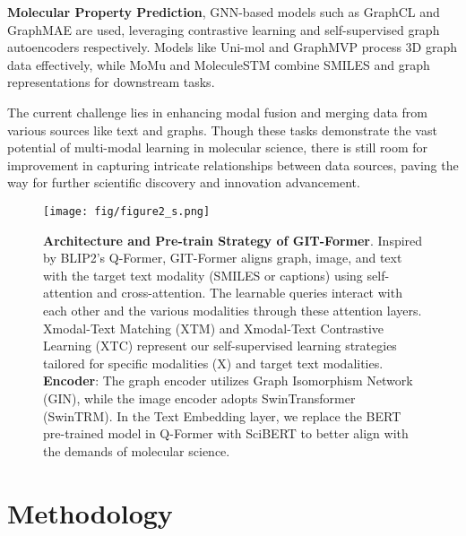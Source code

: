 \documentclass{article}
\begin{document}
\textbf{Molecular Property Prediction}, GNN-based models such as GraphCL\cite{wang2022molecular} and GraphMAE\cite{hou2022graphmae} are used, leveraging contrastive learning and self-supervised graph autoencoders respectively. Models like Uni-mol\cite{zhou2022uni} and GraphMVP\cite{liu2021pre} process 3D graph data effectively, while MoMu and MoleculeSTM combine SMILES and graph representations for downstream tasks.

The current challenge lies in enhancing modal fusion and merging data from various sources like text and graphs. Though these tasks demonstrate the vast potential of multi-modal learning in molecular science, there is still room for improvement in capturing intricate relationships between data sources, paving the way for further scientific discovery and innovation advancement.

\begin{figure*}[t!]
\centering
\texttt{[image: fig/figure2\_s.png]}
\caption{\textbf{Architecture and Pre-train Strategy of GIT-Former}. Inspired by BLIP2's Q-Former, GIT-Former aligns graph, image, and text with the target text modality (SMILES or captions) using self-attention and cross-attention. The learnable queries interact with each other and the various modalities through these attention layers. Xmodal-Text Matching (XTM) and Xmodal-Text Contrastive Learning (XTC) represent our self-supervised learning strategies tailored for specific modalities (X) and target text modalities. \textbf{Encoder}: The graph encoder utilizes Graph Isomorphism Network (GIN), while the image encoder adopts SwinTransformer (SwinTRM). In the Text Embedding layer, we replace the BERT pre-trained model in Q-Former with SciBERT to better align with the demands of molecular science.}
\label{fig: GIT-Former architecture and Pretrain Strategy}
\end{figure*}




\section{Methodology}
\end{document}
